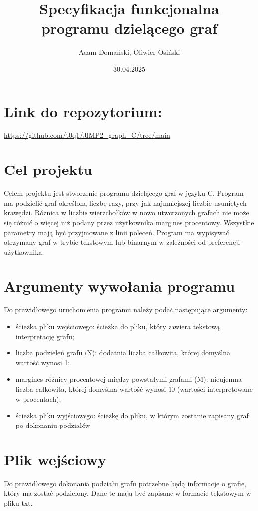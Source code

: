 \documentclass{article}
\title{\textbf{Specyfikacja funkcjonalna programu dzielącego graf}}
\author{Adam Domański, Oliwier Osiński}
\date{30.04.2025}
\begin{document}
\maketitle

\section*{Link do repozytorium:}
\url{https://github.com/t0q1/JIMP2_graph_C/tree/main}

\section*{Cel projektu}

Celem projektu jest stworzenie programu dzielącego graf w języku C. Program ma podzielić graf określoną liczbę razy, przy jak najmniejszej liczbie usuniętych krawędzi. Różnica w liczbie wierzchołków w nowo utworzonych grafach nie może się różnić o więcej niż podany przez użytkownika margines procentowy. Wszystkie parametry mają być przyjmowane z linii poleceń. Program ma wypisywać otrzymany graf w trybie tekstowym lub binarnym w zależności od preferencji użytkownika.

\section*{Argumenty wywołania programu}
Do prawidłowego uruchomienia programu należy podać następujące argumenty:
\begin{itemize}
    \item ścieżka pliku wejściowego: ścieżka do pliku, który zawiera tekstową interpretację grafu;

    \item liczba podzieleń grafu (N): dodatnia liczba całkowita, której domyślna wartość wynosi 1;

    \item margines różnicy procentowej między powstałymi grafami (M): nieujemna liczba całkowita, której domyślna wartość wynosi 10 (wartości interpretowane w procentach);

    \item ścieżka pliku wyjściowego: ścieżkę do pliku, w którym zostanie zapisany graf po dokonaniu podziałów
    
\end{itemize}

\section*{Plik wejściowy}
Do prawidłowego dokonania podziału grafu potrzebne będą informacje o grafie, który ma zostać podzielony. Dane te mają być zapisane w formacie tekstowym w pliku txt.\\
\end{document}
